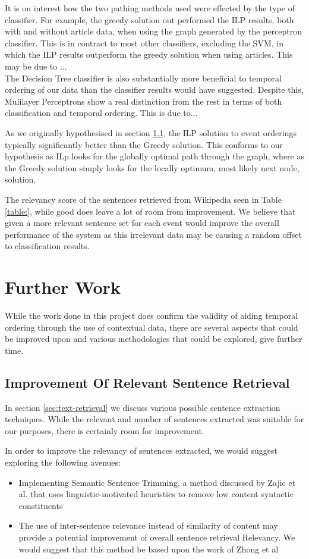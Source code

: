 \documentclass[bsc,frontabs,twoside,singlespacing,parskip,deptreport]{infthesis}     %
\begin{document}
It is on interest how the two pathing methods used were effected by the type of classifier.
For example, the greedy solution out performed the ILP results, both with and without article data,
when using the graph generated by the perceptron classifier. This is in contract to most other classifiers, excluding
the SVM, in which the ILP results outperform the greedy solution when using articles. This may be due to ...\\

The Decision Tree classifier is also substantially more beneficial to temporal ordering of our data than the classifier
results would have suggested. Despite this, Mulilayer Perceptrons show a real distinction from the rest in terms of both
classification and temporal ordering. This is due to...


As we originally hypothesised in section \ref{}, the ILP solution to event orderings typically significantly
better than the Greedy solution. This conforms to our hypothesis as ILp looks for the globally optimal path through
the graph, where as the Greedy solution simply looks for the locally optimum, most likely next node, solution.

The relevancy score of the sentences retrieved from Wikipedia seen in Table \ref{table:}, while good does leave a lot of
room from improvement. We believe that given a more relevant sentence set for each event would improve the overall
performance of the system as this irrelevant data may be causing a random offset to classification results.

\section{Further Work}
While the work done in this project does confirm the validity of aiding temporal ordering through the use of contextual
data, there are several aspects that could be improved upon and various methodologies that could be explored, give further
time.

\subsection{Improvement Of Relevant Sentence Retrieval}
In section \ref{sec:text-retrieval} we discuss various possible sentence extraction techniques.
While the relevant and number of sentences extracted was suitable for our purposes, there is certainly room for improvement.

In order to improve the relevancy of sentences extracted, we would suggest exploring the following avenues:
\begin{itemize}
\item Implementing Semantic Sentence Trimming, a method discussed by Zajic et al. \cite{zajic2005sentence} that
  uses linguistic-motivated heuristics to remove low content syntactic constituents 

\item The use of inter-sentence relevance instead of similarity of content may provide a potential improvement of
  overall sentence retrieval Relevancy. We would suggest that this method be based upon the work of Zhong et al \cite{zhong2008practical}
\end{itemize}
\end{document}
